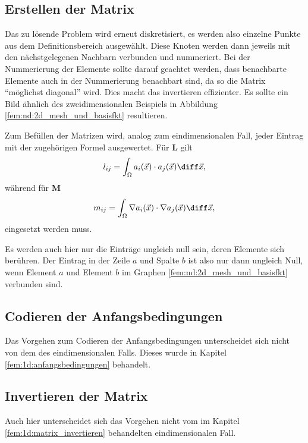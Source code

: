 \subsection{Erstellen der Matrix}
Das zu lösende Problem wird erneut diskretisiert, es werden also einzelne Punkte aus dem Definitionsbereich ausgewählt.
Diese Knoten werden dann jeweils mit den nächstgelegenen Nachbarn verbunden und nummeriert.
Bei der Nummerierung der Elemente sollte darauf geachtet werden, dass benachbarte Elemente auch in der Nummerierung benachbart sind, da so die Matrix ``möglichst diagonal'' wird.
Dies macht das invertieren effizienter.
Es sollte ein Bild ähnlich des zweidimensionalen Beispiels in Abbildung \ref{fem:nd:2d_mesh_und_basisfkt}
resultieren.

Zum Befüllen der Matrizen wird, analog zum eindimensionalen Fall, jeder Eintrag mit der zugehörigen Formel ausgewertet.
Für $\mathbf{L}$ gilt
\begin{equation}
    l_{ij} = \int_{\Omega} a_i(\vec{x}) \cdot a_j(\vec{x}) \diff \vec{x},
\end{equation}
während für $\mathbf{M}$ 
\begin{equation}
    m_{ij} = \int_{\Omega} \nabla a_i(\vec{x}) \cdot \nabla a_j(\vec{x}) \diff \vec{x},
\end{equation}
eingesetzt werden muss.

Es werden auch hier nur die Einträge ungleich null sein, deren Elemente sich berühren.
Der Eintrag in der Zeile $a$ und Spalte $b$ ist also nur dann ungleich Null, wenn Element $a$ und Element $b$ im Graphen \ref{fem:nd:2d_mesh_und_basisfkt} verbunden sind.

\subsection{Codieren der Anfangsbedingungen}
Das Vorgehen zum Codieren der Anfangsbedingungen unterscheidet sich nicht von dem des eindimensionalen Falls. 
Dieses wurde in Kapitel \ref{fem:1d:anfangsbedingungen} behandelt.

\subsection{Invertieren der Matrix}
Auch hier unterscheidet sich das Vorgehen nicht vom im Kapitel \ref{fem:1d:matrix_invertieren} behandelten eindimensionalen Fall.